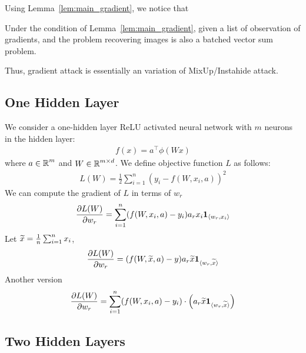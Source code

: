 Using Lemma~\ref{lem:main_gradient}, we notice that
\begin{lemma}
Under the condition of Lemma~\ref{lem:main_gradient}, given a list of observation of gradients, and the problem recovering images is also a batched vector sum problem. 

\end{lemma}
Thus, gradient attack is essentially an variation of MixUp/Instahide attack.

\subsection{One Hidden Layer}\label{sec:gradient_1}
We consider a one-hidden layer ReLU activated neural network with $m$ neurons in the hidden layer:
\begin{align*}
    f(x) = a^\top \phi(W x )
\end{align*}
where $a\in \operatorname{{\mathbb R}}^m$ and $W \in \operatorname{{\mathbb R}}^{m \times d}$.
We define objective function $L$ as follows:
\begin{align*}
    L(W) = \frac{1}{2} \sum_{i=1}^n (y_i - f(W,x_i,a))^2
\end{align*}
We can compute the gradient of $L$ in terms of $w_r$
\begin{align*}
    \frac{ \partial L(W) }{ \partial w_r } = \sum_{i=1}^n ( f(W,x_i,a) -y_i ) a_r x_i {\bf 1}_{ \langle w_r, x_i \rangle }
\end{align*}
Let $\widetilde{x} = \frac{1}{n} \sum_{i=1}^n x_i$,
\begin{align*}
    \frac{ \partial L(W) }{ \partial w_r } = ( f(W, \widetilde{x}, a) - y ) a_r \widetilde{x} {\bf 1}_{\langle w_r, \widetilde{x} \rangle}
\end{align*}
Another version
\begin{align*}
    \frac{ \partial L(W) }{ \partial w_r } = \sum_{i=1}^n ( f(W, x_i, a) - y_i ) \cdot \Big( a_r \widetilde{x} {\bf 1}_{\langle w_r, \widetilde{x} \rangle} \Big)
\end{align*}


\subsection{Two Hidden Layers}\label{sec:gradient_2}


